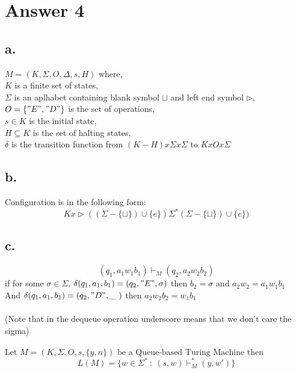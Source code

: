 \documentclass[12pt]{article}
\begin{document}
\section*{Answer 4}

\subsection*{a.}
$M=(K,\Sigma,O,\Delta,s,H)$ where, \\
$K$ is a finite set of states, \\
$\Sigma$ is an aplhabet containing blank symbol $\sqcup$ and left end symbol $\triangleright$, \\
$O=\{"E","D"\}$ is the set of operations, \\
$s\in K$ is the initial state, \\
$H\subseteq K$ is the set of halting states, \\
$\delta$ is the transition function from $(K-H)x\Sigma x\Sigma$ to $KxOx\Sigma$
\subsection*{b.}
Configuration is in the following form: \\
$$Kx\triangleright ((\Sigma-\{\sqcup \})\cup \{e\})\Sigma^*(\Sigma-\{\sqcup \})\cup \{e\})$$
\subsection*{c.}
$$(q_1,a_1w_1b_1) \vdash_M (q_2,a_2w_2b_2)$$
if for some $\sigma \in \Sigma$, $\delta(q_1,a_1,b_1)=(q_2,"E",\sigma)$ then $b_2=\sigma$ and $a_2w_2=a_1w_1b_1$ \\
And $\delta(q_1,a_1,b_1)=(q_2,"D",\_ \ )$ then $a_2w_2b_2=w_1b_1$ \\ \\
(Note that in the dequeue operation underscore means that we don't care the sigma) \\ \\
$\text{Let } M=(K,\Sigma,O,s,\{y,n \}) \text{ be a Queue-based Turing Machine then } $
$$L(M)=\{w\in\Sigma^*\ :\ (s,w)\vdash^*_M (y,w')\}$$
\end{document}
